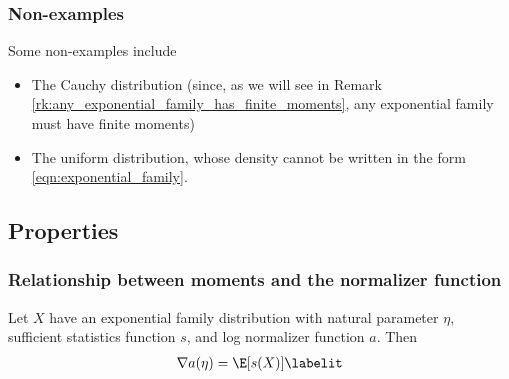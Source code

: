 \documentclass{article} %
\newcommand{\logNormalizerFunction}{a}
\newcommand{\sufficientStatsFunction}{s}
\newcommand{\naturalParam}{\eta}
\begin{document}
\subsubsection{Non-examples}

Some non-examples include 
\begin{itemize}
\item The Cauchy distribution (since, as we will see in Remark \ref{rk:any_exponential_family_has_finite_moments}, any exponential family must have finite moments)
\item The uniform distribution, whose density cannot be written in the form \eqref{eqn:exponential_family}. %
\end{itemize}


\subsection{Properties}

\subsubsection{Relationship between moments and the normalizer function} \label{sec:relationship_between_moments_and_normalizer}

\begin{proposition}
Let $X$ have an exponential family distribution with natural parameter $\naturalParam$, sufficient statistics function $\sufficientStatsFunction$, and log normalizer function $\logNormalizerFunction$.   Then  
\begin{align*}
\nabla \logNormalizerFunction(\naturalParam) = \E[\sufficientStatsFunction(X)] 
\labelit \label{eqn:expected_sufficient_statistic_as_derivative_of_log_normalizer}	
\end{align*}
\label{prop:expected_sufficient_statistic_as_derivative_of_log_normalizer}
\end{proposition}
\end{document}
